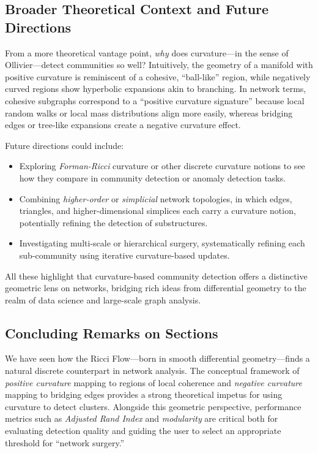 \subsection{Broader Theoretical Context and Future Directions}
From a more theoretical vantage point, \emph{why} does curvature---in the sense of Ollivier---detect communities so well? Intuitively, the geometry of a manifold with positive curvature is reminiscent of a cohesive, ``ball-like'' region, while negatively curved regions show hyperbolic expansions akin to branching. In network terms, cohesive subgraphs correspond to a “positive curvature signature” because local random walks or local mass distributions align more easily, whereas bridging edges or tree-like expansions create a negative curvature effect. 

Future directions could include:
\begin{itemize}
    \item Exploring \emph{Forman-Ricci} curvature or other discrete curvature notions to see how they compare in community detection or anomaly detection tasks.
    \item Combining \emph{higher-order} or \emph{simplicial} network topologies, in which edges, triangles, and higher-dimensional simplices each carry a curvature notion, potentially refining the detection of substructures.
    \item Investigating multi-scale or hierarchical surgery, systematically refining each sub-community using iterative curvature-based updates.
\end{itemize}

All these highlight that curvature-based community detection offers a distinctive geometric lens on networks, bridging rich ideas from differential geometry to the realm of data science and large-scale graph analysis.

\subsection{Concluding Remarks on Sections}
We have seen how the Ricci Flow---born in smooth differential geometry---finds a natural discrete counterpart in network analysis. The conceptual framework of \emph{positive curvature} mapping to regions of local coherence and \emph{negative curvature} mapping to bridging edges provides a strong theoretical impetus for using curvature to detect clusters. Alongside this geometric perspective, performance metrics such as \emph{Adjusted Rand Index} and \emph{modularity} are critical both for evaluating detection quality and guiding the user to select an appropriate threshold for “network surgery.” 

